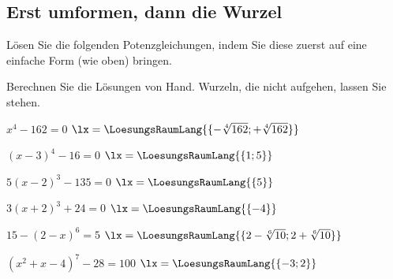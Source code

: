 \subsection{Erst umformen, dann die Wurzel}%
Lösen Sie die folgenden Potenzgleichungen, indem Sie diese zuerst auf eine einfache Form (wie oben) bringen.

Berechnen Sie die Lösungen von Hand. Wurzeln, die nicht aufgehen, lassen Sie stehen.


\begin{bbwAufgabenBlock}

\item
 $x^4-162 = 0$ \hspace{10mm} $\lx=\LoesungsRaumLang{\{-\sqrt[4]{162}; +\sqrt[4]{162}\}}$

\item
 $(x-3)^4 - 16 = 0$ \hspace{10mm} $\lx=\LoesungsRaumLang{\{1; 5\}}$
 \noTRAINER{\newpage}

\item
 $5(x-2)^3 - 135 = 0$ \hspace{10mm} $\lx=\LoesungsRaumLang{\{5\}}$

\item
 $3(x+2)^3 + 24 = 0$ \hspace{10mm} $\lx=\LoesungsRaumLang{\{-4\}}$

\item
 $15-(2-x)^6 = 5$ \hspace{10mm} $\lx=\LoesungsRaumLang{\{2-\sqrt[6]{10}; 2+\sqrt[6]{10}\}}$

\noTRAINER{\newpage}

\item
$(x^2+x-4)^7 - 28 = 100$  \hspace{10mm} $\lx=\LoesungsRaumLang{\{ -3; 2  \}}$

\end{bbwAufgabenBlock}
\noTRAINER{\newpage}

